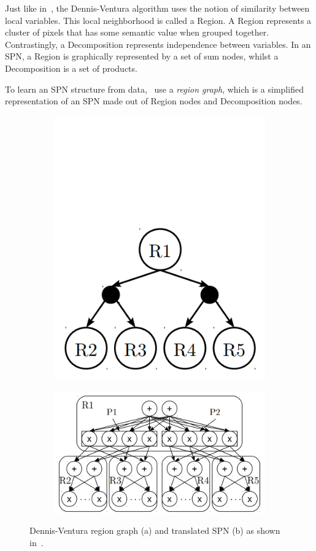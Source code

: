 Just like in~\cite{poon-domingos}, the Dennis-Ventura algorithm uses the notion of similarity
between local variables.  This local neighborhood is called a Region. A Region represents a cluster
of pixels that has some semantic value when grouped together. Contrastingly, a Decomposition
represents independence between variables. In an SPN, a Region is graphically represented by a set
of sum nodes, whilst a Decomposition is a set of products.

To learn an SPN structure from data,~\cite{clustering} use a \textit{region graph}, which is a
simplified representation of an SPN made out of Region nodes and Decomposition nodes.

\begin{figure}[h]
  \begin{subfigure}{.4\linewidth}
    \centering\includegraphics[scale=1.0]{imgs/simple_dv.png}
    \caption{}
  \end{subfigure}
  \begin{subfigure}{.6\linewidth}
    \centering\includegraphics[scale=1.0]{imgs/trans_dv.png}
    \caption{}
  \end{subfigure}
  \caption{Dennis-Ventura region graph (a) and translated SPN (b) as shown in~\cite{clustering}.}
\end{figure}

